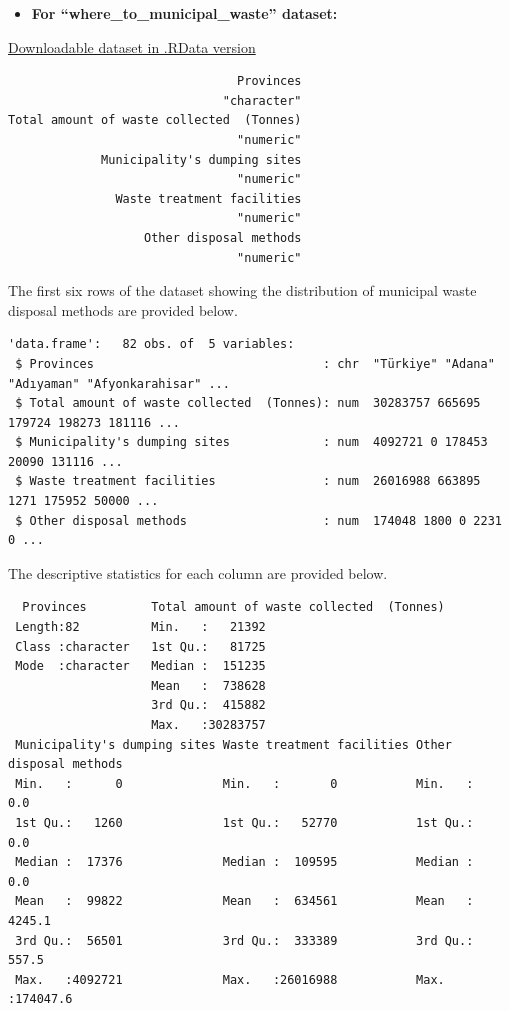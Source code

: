 \documentclass[
  11pt,
  a4paper,
  DIV=11,
  numbers=noendperiod]{scrartcl}
\providecommand{\tightlist}{%
  \setlength{\itemsep}{0pt}\setlength{\parskip}{0pt}}\usepackage{longtable,booktabs,array}
\begin{document}
\begin{itemize}
\tightlist
\item
  \textbf{For ``where\_to\_municipal\_waste'' dataset:}
\end{itemize}

\href{https://github.com/emu-hacettepe-analytics/emu660-spring2024-Dilara-pro/tree/main/project/data}{Downloadable
dataset in .RData version}

\begin{verbatim}
                                Provinces 
                              "character" 
Total amount of waste collected  (Tonnes) 
                                "numeric" 
             Municipality's dumping sites 
                                "numeric" 
               Waste treatment facilities 
                                "numeric" 
                   Other disposal methods 
                                "numeric" 
\end{verbatim}

The first six rows of the dataset showing the distribution of municipal
waste disposal methods are provided below.

\begin{verbatim}
'data.frame':   82 obs. of  5 variables:
 $ Provinces                                : chr  "Türkiye" "Adana" "Adıyaman" "Afyonkarahisar" ...
 $ Total amount of waste collected  (Tonnes): num  30283757 665695 179724 198273 181116 ...
 $ Municipality's dumping sites             : num  4092721 0 178453 20090 131116 ...
 $ Waste treatment facilities               : num  26016988 663895 1271 175952 50000 ...
 $ Other disposal methods                   : num  174048 1800 0 2231 0 ...
\end{verbatim}

The descriptive statistics for each column are provided below.

\begin{verbatim}
  Provinces         Total amount of waste collected  (Tonnes)
 Length:82          Min.   :   21392                         
 Class :character   1st Qu.:   81725                         
 Mode  :character   Median :  151235                         
                    Mean   :  738628                         
                    3rd Qu.:  415882                         
                    Max.   :30283757                         
 Municipality's dumping sites Waste treatment facilities Other disposal methods
 Min.   :      0              Min.   :       0           Min.   :     0.0      
 1st Qu.:   1260              1st Qu.:   52770           1st Qu.:     0.0      
 Median :  17376              Median :  109595           Median :     0.0      
 Mean   :  99822              Mean   :  634561           Mean   :  4245.1      
 3rd Qu.:  56501              3rd Qu.:  333389           3rd Qu.:   557.5      
 Max.   :4092721              Max.   :26016988           Max.   :174047.6      
\end{verbatim}
\end{document}
